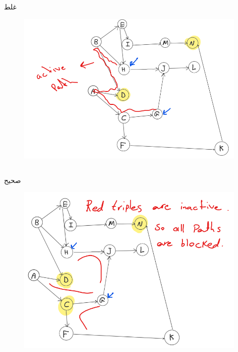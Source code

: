 \documentclass{university}
\begin{document}
\setupdocument

\section{}
\subsection{}
غلط
\begin{figure}[H]
    \centering
    \includegraphics[width=\textwidth]{assets/1a.png}
\end{figure}

\subsection{}
صحیح
\begin{figure}[H]
    \centering
    \includegraphics[width=\textwidth]{assets/1b.png}
\end{figure}
\end{document}
